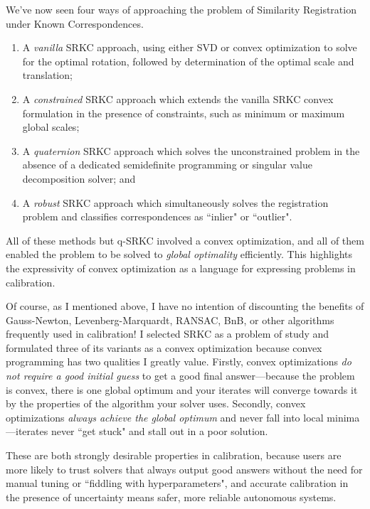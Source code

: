 \documentclass[conference]{IEEEtran}
\begin{document}
We've now seen four ways of approaching the problem of Similarity Registration under Known Correspondences.

\begin{enumerate}
	\item A \textit{vanilla} SRKC approach, using either SVD or convex optimization to solve for the optimal rotation, followed by determination of the optimal scale and translation;
	\item A \textit{constrained} SRKC approach which extends the vanilla SRKC convex formulation in the presence of constraints, such as minimum or maximum global scales;
	\item A \textit{quaternion} SRKC approach which solves the unconstrained problem in the absence of a dedicated semidefinite programming or singular value decomposition solver; and
	\item A \textit{robust} SRKC approach which simultaneously solves the registration problem and classifies correspondences as ``inlier" or ``outlier".
\end{enumerate}

All of these methods but q-SRKC involved a convex optimization, and all of them enabled the problem to be solved to \textit{global optimality} efficiently.  This highlights the expressivity of convex optimization as a language for expressing problems in calibration.

Of course, as I mentioned above, I have no intention of discounting the benefits of Gauss-Newton, Levenberg-Marquardt, RANSAC, BnB, or other algorithms frequently used in calibration!  I selected SRKC as a problem of study and formulated three of its variants as a convex optimization because convex programming has two qualities I greatly value.  Firstly, convex optimizations \textit{do not require a good initial guess} to get a good final answer---because the problem is convex, there is one global optimum and your iterates will converge towards it by the properties of the algorithm your solver uses.  Secondly, convex optimizations \textit{always achieve the global optimum} and never fall into local minima---iterates never ``get stuck" and stall out in a poor solution.

These are both strongly desirable properties in calibration, because users are more likely to trust solvers that always output good answers without the need for manual tuning or ``fiddling with hyperparameters", and accurate calibration in the presence of uncertainty means safer, more reliable autonomous systems.
\end{document}
